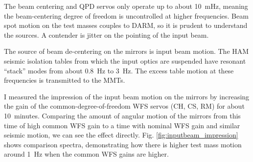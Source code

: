 The beam centering and QPD servos only operate up to about 10~mHz,
meaning the beam-centering degree of freedom is uncontrolled at higher
frequencies. Beam spot motion on the test masses couples to
DARM, so it is prudent to understand the sources. A contender is
jitter on the pointing of the input beam. 

The source of beam de-centering on the mirrors is input
beam motion. The HAM seismic isolation tables from which the input
optics are suspended have resonant ``stack'' modes from about 0.8~Hz
to 3~Hz. The excess table motion at these frequencies is transmitted
to the MMTs.

I measured the impression of the input beam motion on the mirrors by
increasing the gain of the common-degree-of-freedom WFS servos (CH,
CS, RM) for about 10~minutes. Comparing the amount of angular
motion of the mirrors from this time of high common WFS gain to a time
with nominal WFS gain and similar seismic motion, we can see the
effect directly. Fig. \ref{fig:inputbeam_impression} shows comparison
spectra, demonstrating how there is higher test mass motion around
1~Hz when the common WFS gains are higher.

